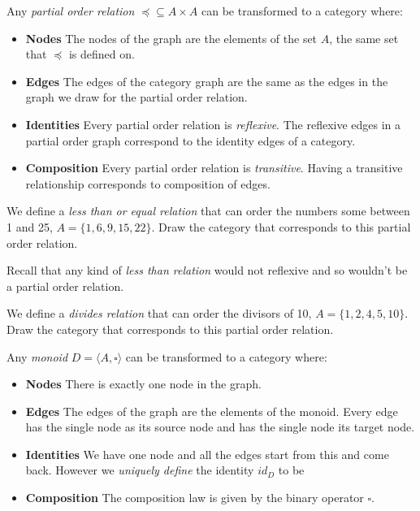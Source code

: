 

Any \textit{partial order relation} $\preccurlyeq \subseteq A \times A$ 
can be transformed to a category where:
\begin{itemize}   
\renewcommand{\labelitemi}{$\Box$}
\item \textbf{Nodes} The nodes of the graph are the elements of the set 
$A$, the same set that $\preccurlyeq$ is defined on.
\item \textbf{Edges} The edges of the category graph are the same 
as the edges in the graph we draw for the partial order relation.  
\item \textbf{Identities} Every partial order relation is \textit{reflexive}. 
The reflexive edges in a partial order graph 
correspond to the identity edges of a category. 
\item \textbf{Composition} 
Every partial order relation is \textit{transitive}.
Having a transitive relationship corresponds to 
composition of edges. 
\end{itemize}


\begin{example}
We define a \textit{less than or equal relation} that 
can order the numbers some between 1 and 25, $A = \{1,6,9,15,22\}$.
Draw the category that corresponds to this partial order relation.
\end{example}

\frmrule

Recall that any kind of \textit{less than relation} 
would not reflexive and so wouldn't be a partial order relation. 


\begin{example}
We define a \textit{divides relation} that 
can order the divisors of 10, $A = \{1,2,4,5,10\}$.
Draw the category that corresponds to this partial order relation.
\end{example}

\frmrule


Any \textit{monoid} $D = \langle A, \square \rangle$ 
can be transformed to a category where:
\begin{itemize}   
\renewcommand{\labelitemi}{$\Box$}
\item \textbf{Nodes} There is exactly one node in the graph.
\item \textbf{Edges} The edges of the graph are the elements of the monoid.
Every edge has the single node as its source node and has the 
single node its target node.
\item \textbf{Identities} We have one node and all the edges start from this 
and come back. However we \textit{uniquely define} the identity $id_D$ to be 
\item \textbf{Composition} 
The composition law is given by the binary operator $\square$. 
\end{itemize}

